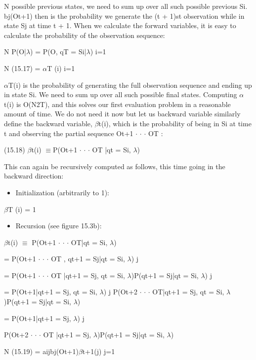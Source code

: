 N possible previous states, we need to sum up over all such possible previous Si. bj(Ot+1) then is the probability we generate the (t + 1)st observation while in state Sj at time t + 1. When we calculate the forward variables, it is easy to calculate the probability of the observation sequence:

N P(O|$\lambda$) = P(O, qT = Si|$\lambda$) i=1

N (15.17) = $\alpha$T (i) i=1

$\alpha$T(i) is the probability of generating the full observation sequence and ending up in state Si. We need to sum up over all such possible final states. Computing $\alpha$t(i) is O(N2T), and this solves our first evaluation problem in a reasonable amount of time. We do not need it now but let us backward variable similarly define the backward variable, $\beta$t(i), which is the probability of being in Si at time t and observing the partial sequence Ot+1 $\cdot$ $\cdot$ $\cdot$ OT :

(15.18) $\beta$t(i) $\equiv$P(Ot+1 $\cdot$ $\cdot$ $\cdot$ OT |qt = Si, $\lambda$)

This can again be recursively computed as follows, this time going in the backward direction:

\begin{itemize}
\item Initialization (arbitrarily to 1):
\end{itemize}

$\beta$T (i) = 1

\begin{itemize}
\item Recursion (see figure 15.3b):
\end{itemize}

$\beta$t(i) $\equiv$ P(Ot+1 $\cdot$ $\cdot$ $\cdot$ OT|qt = Si, $\lambda$)

= P(Ot+1 $\cdot$ $\cdot$ $\cdot$ OT , qt+1 = Sj|qt = Si, $\lambda$) j

= P(Ot+1 $\cdot$ $\cdot$ $\cdot$ OT |qt+1 = Sj, qt = Si, $\lambda$)P(qt+1 = Sj|qt = Si, $\lambda$) j

= P(Ot+1|qt+1 = Sj, qt = Si, $\lambda$) j P(Ot+2 $\cdot$ $\cdot$ $\cdot$ OT|qt+1 = Sj, qt = Si, $\lambda$)P(qt+1 = Sj|qt = Si, $\lambda$)

= P(Ot+1|qt+1 = Sj, $\lambda$) j

P(Ot+2 $\cdot$ $\cdot$ $\cdot$ OT |qt+1 = Sj, $\lambda$)P(qt+1 = Sj|qt = Si, $\lambda$)

N (15.19) = aijbj(Ot+1)$\beta$t+1(j) j=1

